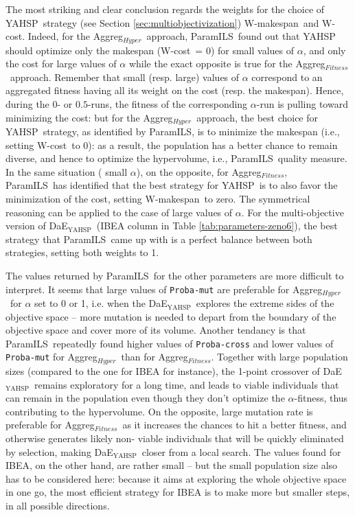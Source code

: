 \documentclass{llncs}
\newcommand{\DAEYAHSP}{{\sc DaE$_{\text{YAHSP}}$}}
\def\YAHSP{{\sc YAHSP}}
\def\PARAMILS{{\sc ParamILS}}
\def\AGGREGHYPER{{Aggreg$_{Hyper}$}}
\def\AGGREGFITNESS{{Aggreg$_{Fitness}$}}
\def\WMAKESPAN{{W-makespan}}
\def\WCOST{{W-cost}}
\begin{document}
The most striking and clear conclusion regards the weights for the choice of \YAHSP\ strategy (see Section \ref{sec:multiobjectivization}) \WMAKESPAN\ and \WCOST. Indeed, for the \AGGREGHYPER\ approach, \PARAMILS\ found out that YAHSP should optimize only the makespan (\WCOST\ = 0) for small values of $\alpha$, and only the cost for large values of $\alpha$ while the exact opposite is true for the \AGGREGFITNESS\ approach. Remember that small (resp. large) values of $\alpha$ correspond to an aggregated fitness having all its weight on the cost (resp. the makespan). Hence, during the $0$- or $0.5$-runs, the fitness of the corresponding $\alpha$-run is pulling toward minimizing the cost: but for the \AGGREGHYPER\ approach, the best choice for \YAHSP\ strategy, as identified by \PARAMILS, is to minimize the makespan (i.e., setting \WCOST\ to 0): as a result, the population has a better chance to remain diverse, and hence to optimize the hypervolume, i.e.,  \PARAMILS\ quality measure. In the same situation (
small $\alpha$), on the opposite, for \AGGREGFITNESS, \PARAMILS\ has identified that the best strategy for \YAHSP\ is to also favor the minimization of the cost, setting \WMAKESPAN\ to zero. The symmetrical reasoning can be applied to the case of large values of $\alpha$.
For the multi-objective version of \DAEYAHSP\ (IBEA column in Table \ref{tab:parameters-zeno6}), the best strategy that \PARAMILS\ came up with is a perfect balance between both strategies, setting both weights to 1.


The values returned by \PARAMILS\ for the other parameters are more difficult to interpret. It seems that large values of {\tt Proba-mut} are preferable for \AGGREGHYPER\ for $\alpha$ set to 0 or 1, i.e. when the \DAEYAHSP\ explores the extreme sides of the objective space -- more mutation is needed to depart from the boundary of the objective space and cover more of its volume. Another tendancy is that \PARAMILS\ repeatedly found higher values of {\tt Proba-cross} and lower values of {\tt Proba-mut} for \AGGREGHYPER\ than for \AGGREGFITNESS. Together with large population sizes (compared to the one for IBEA for instance), the 1-point crossover of \DAEYAHSP\ remains exploratory for a long time, and leads to viable individuals that can remain in the population even though they don't optimize the $\alpha$-fitness, thus contributing to the hypervolume. On the opposite, large mutation rate is preferable for \AGGREGFITNESS\ as it increases the chances to hit a better fitness, and otherwise generates likely non-
viable individuals that will be quickly eliminated by selection, making \DAEYAHSP\ closer from a local search. The values found for IBEA, on the other hand, are rather small -- but the small population size also has to be considered here: because it aims at exploring the whole objective space in one go, the most efficient strategy for IBEA is to make more but smaller steps, in all possible directions.
\end{document}
